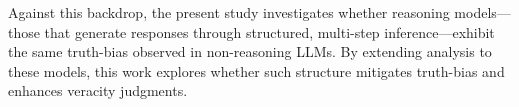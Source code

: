 \documentclass{article}
\begin{document}
Against this backdrop, the present study investigates whether reasoning models---those that generate responses through structured, multi-step inference---exhibit the same truth-bias observed in non-reasoning LLMs. By extending analysis to these models, this work explores whether such structure mitigates truth-bias and enhances veracity judgments.






\end{document}
